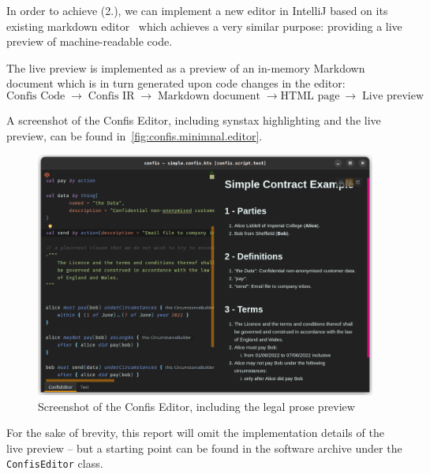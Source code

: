 In order to achieve (2.), we can implement a new editor in IntelliJ based on its existing markdown editor~\cite{ideaMarkdownPreview} which achieves a very similar purpose: providing a live preview of machine-readable code.

The live preview is implemented as a preview of an in-memory Markdown document which is in turn generated upon code changes in the editor:
\begin{equation*}
    \text{Confis Code}\; \to\; \text{Confis IR}\; \to\; \text{Markdown document}\; \to \text{HTML page}\ \to\; \text{Live preview}
\end{equation*}

A screenshot of the Confis Editor, including synstax highlighting and the live preview, can be found in~\autoref{fig:confis.minimnal.editor}.

\begin{figure}[h]
    \centering
    \includegraphics[width=\textwidth]{figures/simple.confis.editor}
    \caption{Screenshot of the Confis Editor, including the legal prose preview}
    \label{fig:confis.minimnal.editor}
\end{figure}



For the sake of brevity, this report will omit the implementation details of the live preview -- but a starting point can be found in the software archive under the \texttt{ConfisEditor} class.

